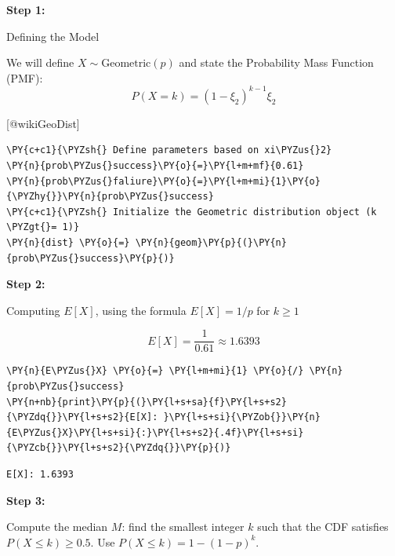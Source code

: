     \textbf{Step 1:}

Defining the Model

We will define \(X \sim \text{Geometric}(p)\) and state the Probability
Mass Function (PMF): \[P(X=k) = (1 - \xi_2)^{k-1} \xi_2\]

{[}@wikiGeoDist{]}

    \begin{tcolorbox}[breakable, size=fbox, boxrule=1pt, pad at break*=1mm,colback=cellbackground, colframe=cellborder]
\begin{Verbatim}[commandchars=\\\{\}]
\PY{c+c1}{\PYZsh{} Define parameters based on xi\PYZus{}2}
\PY{n}{prob\PYZus{}success}\PY{o}{=}\PY{l+m+mf}{0.61}
\PY{n}{prob\PYZus{}faliure}\PY{o}{=}\PY{l+m+mi}{1}\PY{o}{\PYZhy{}}\PY{n}{prob\PYZus{}success}
\PY{c+c1}{\PYZsh{} Initialize the Geometric distribution object (k \PYZgt{}= 1)}
\PY{n}{dist} \PY{o}{=} \PY{n}{geom}\PY{p}{(}\PY{n}{prob\PYZus{}success}\PY{p}{)}
\end{Verbatim}
\end{tcolorbox}

    \textbf{Step 2:}

Computing \(E[X]\), using the formula \(E[X] = 1/p\) for \(k \ge 1\)

\[ E[X] = \frac{1}{0.61} \approx \mathbf{1.6393} \]
\cite{con:coursebook}

    \begin{tcolorbox}[breakable, size=fbox, boxrule=1pt, pad at break*=1mm,colback=cellbackground, colframe=cellborder]
\begin{Verbatim}[commandchars=\\\{\}]
\PY{n}{E\PYZus{}X} \PY{o}{=} \PY{l+m+mi}{1} \PY{o}{/} \PY{n}{prob\PYZus{}success}
\PY{n+nb}{print}\PY{p}{(}\PY{l+s+sa}{f}\PY{l+s+s2}{\PYZdq{}}\PY{l+s+s2}{E[X]: }\PY{l+s+si}{\PYZob{}}\PY{n}{E\PYZus{}X}\PY{l+s+si}{:}\PY{l+s+s2}{.4f}\PY{l+s+si}{\PYZcb{}}\PY{l+s+s2}{\PYZdq{}}\PY{p}{)}
\end{Verbatim}
\end{tcolorbox}

    \begin{Verbatim}[commandchars=\\\{\}]
E[X]: 1.6393
    \end{Verbatim}

    \textbf{Step 3:}

Compute the median \(M\): find the smallest integer \(k\) such that the
CDF satisfies \(P(X \le k) \ge 0.5\). Use \(P(X \le k) = 1 - (1-p)^k\).

